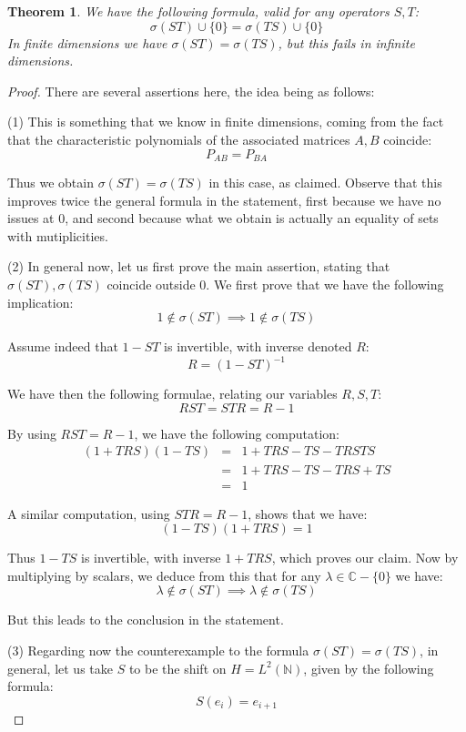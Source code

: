 \documentclass[12pt]{amsbook}
\newtheorem{theorem}{Theorem}[chapter]
\begin{document}

\begin{theorem}
We have the following formula, valid for any operators $S,T$:
$$\sigma(ST)\cup\{0\}=\sigma(TS)\cup\{0\}$$
In finite dimensions we have $\sigma(ST)=\sigma(TS)$, but this fails in infinite dimensions.
\end{theorem}

\begin{proof}
There are several assertions here, the idea being as follows:

\medskip

(1) This is something that we know in finite dimensions, coming from the fact that the characteristic polynomials of the associated matrices $A,B$ coincide:
$$P_{AB}=P_{BA}$$

Thus we obtain $\sigma(ST)=\sigma(TS)$ in this case, as claimed. Observe that this improves twice the general formula in the statement, first because we have no issues at 0, and second because what we obtain is actually an equality of sets with mutiplicities.

\medskip

(2) In general now, let us first prove the main assertion, stating that $\sigma(ST),\sigma(TS)$ coincide outside 0. We first prove that we have the following implication:
$$1\notin\sigma(ST)\implies1\notin\sigma(TS)$$

Assume indeed that $1-ST$ is invertible, with inverse denoted $R$:
$$R=(1-ST)^{-1}$$

We have then the following formulae, relating our variables $R,S,T$:
$$RST=STR=R-1$$

By using $RST=R-1$, we have the following computation:
\begin{eqnarray*}
(1+TRS)(1-TS)
&=&1+TRS-TS-TRSTS\\
&=&1+TRS-TS-TRS+TS\\
&=&1
\end{eqnarray*}

A similar computation, using $STR=R-1$, shows that we have:
$$(1-TS)(1+TRS)=1$$

Thus $1-TS$ is invertible, with inverse $1+TRS$, which proves our claim. Now by multiplying by scalars, we deduce from this that for any $\lambda\in\mathbb C-\{0\}$ we have:
$$\lambda\notin\sigma(ST)\implies\lambda\notin\sigma(TS)$$ 

But this leads to the conclusion in the statement.

\medskip

(3) Regarding now the counterexample to the formula $\sigma(ST)=\sigma(TS)$, in general, let us take $S$ to be the shift on $H=L^2(\mathbb N)$, given by the following formula:
$$S(e_i)=e_{i+1}$$


\end{proof}
\end{document}
